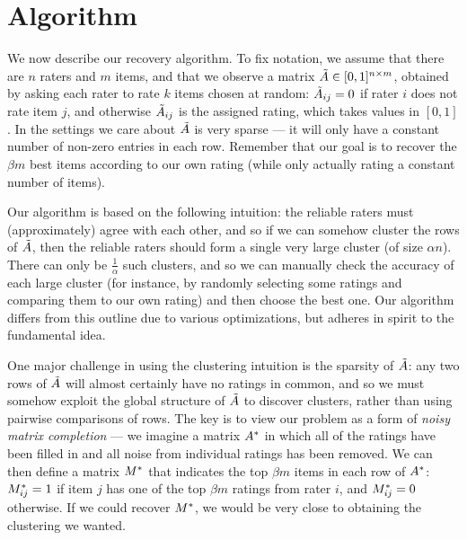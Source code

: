 \section{Algorithm}
\label{sec:algorithm}


We now describe our recovery algorithm. To fix notation, we assume that 
there are $n$ raters and $m$ items, and that we observe a matrix 
$\tilde{A} \in [0,1]^{n \times m}$, obtained by asking each rater to rate $k$ 
items chosen at random: $\tilde{A}_{ij} = 0$ if rater $i$ does not rate item 
$j$, and otherwise $\tilde{A}_{ij}$ is the assigned rating, which takes values 
in $[0,1]$. In the settings we 
care about $\tilde{A}$ is very sparse --- it will only have a constant number of 
non-zero entries in each row. Remember that our goal is to recover the 
$\beta m$ best items according to our own rating (while only actually rating a 
constant number of items).

Our algorithm is based on the following intuition: the reliable raters must 
(approximately) agree with each other, and so if we can somehow cluster the 
rows of $\tilde{A}$, then the reliable raters should form a single very large cluster 
(of size $\alpha n$). There can only be $\frac{1}{\alpha}$ such clusters, and 
so we can manually check the accuracy of each large cluster (for instance, 
by randomly selecting some ratings and comparing them to our own rating) and 
then choose the best one.
Our algorithm differs from this outline due to various 
optimizations, but adheres in spirit to the fundamental idea. 



One major challenge in using the clustering intuition is the sparsity of 
$\tilde{A}$: any two rows of $\tilde{A}$ will almost certainly have no ratings in common, 
and so we must somehow exploit the global structure of $\tilde{A}$ to discover 
clusters, rather than using pairwise comparisons of rows.
The key is to view our problem as a form of \emph{noisy matrix completion} --- 
we imagine a matrix $A^*$ in which all of the ratings have been filled in 
and all noise from individual ratings has been removed. We can then define a 
matrix $M^*$ that indicates the top $\beta m$ items in each row of $A^*$: 
$M^*_{ij} = 1$ if item $j$ has one of the top $\beta m$ ratings from rater $i$, 
and $M^*_{ij} = 0$ otherwise. If we could recover $M^*$, we would be very 
close to obtaining the clustering we wanted.

